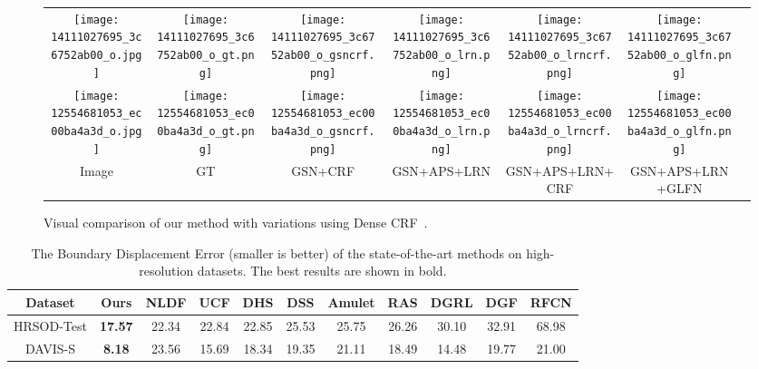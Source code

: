 \documentclass[10pt,twocolumn,letterpaper]{article}
\begin{document}
    \begin{figure*}[!t]
    \centering
     \renewcommand{\arraystretch}{0.5}
        \begin{tabular}{ccccccc}
         \texttt{[image: 14111027695\_3c6752ab00\_o.jpg]}&
        \texttt{[image: 14111027695\_3c6752ab00\_o\_gt.png]}&
        \texttt{[image: 14111027695\_3c6752ab00\_o\_gsncrf.png]}&  \texttt{[image: 14111027695\_3c6752ab00\_o\_lrn.png]}&   \texttt{[image: 14111027695\_3c6752ab00\_o\_lrncrf.png]}&
        \texttt{[image: 14111027695\_3c6752ab00\_o\_glfn.png]}\\
        \texttt{[image: 12554681053\_ec00ba4a3d\_o.jpg]}&
        \texttt{[image: 12554681053\_ec00ba4a3d\_o\_gt.png]}&
        \texttt{[image: 12554681053\_ec00ba4a3d\_o\_gsncrf.png]}&  \texttt{[image: 12554681053\_ec00ba4a3d\_o\_lrn.png]}&   \texttt{[image: 12554681053\_ec00ba4a3d\_o\_lrncrf.png]}&
        \texttt{[image: 12554681053\_ec00ba4a3d\_o\_glfn.png]}\\
\footnotesize Image &\footnotesize GT &\footnotesize GSN+CRF &\footnotesize GSN+APS+LRN &\footnotesize GSN+APS+LRN+CRF&\footnotesize GSN+APS+LRN+GLFN \\
        \end{tabular}
        \vspace{0.8mm}
    \caption{Visual comparison of our method with variations using Dense CRF~\cite{krahenbuhl2011efficient}.}
    \vspace{-6mm}
    \label{fig:compare}
    \end{figure*}
    \begin{table*}[htp]
\setlength{\tabcolsep}{5pt}
\centering
\renewcommand{\arraystretch}{1}
\begin{tabular}{|c|c|c|c|c|c|c|c|c|c|c|}
\hline
Dataset& Ours&NLDF&UCF&DHS&DSS&Amulet&RAS&DGRL&DGF&RFCN\\
\hline
HRSOD-Test&\textbf{17.57}&22.34&22.84&22.85&25.53&25.75&26.26&30.10&32.91&68.98\\
\hline
DAVIS-S&\textbf{8.18}&23.56&15.69&18.34&19.35&21.11&18.49&14.48&19.77&21.00\\
\hline
\end{tabular}
\vspace{1.1mm}
\caption{The Boundary Displacement Error (smaller is better) of the state-of-the-art methods on high-resolution datasets. The best results are shown in bold.}\label{tab:bde}
\end{table*}
\end{document}
